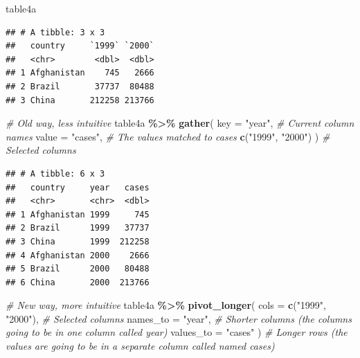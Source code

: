 \documentclass[
]{book}
\newenvironment{Shaded}{\begin{snugshade}}{\end{snugshade}}
\newcommand{\AttributeTok}[1]{\textcolor[rgb]{0.13,0.29,0.53}{#1}}
\newcommand{\CommentTok}[1]{\textcolor[rgb]{0.56,0.35,0.01}{\textit{#1}}}
\newcommand{\FunctionTok}[1]{\textcolor[rgb]{0.13,0.29,0.53}{\textbf{#1}}}
\newcommand{\NormalTok}[1]{#1}
\newcommand{\SpecialCharTok}[1]{\textcolor[rgb]{0.81,0.36,0.00}{\textbf{#1}}}
\newcommand{\StringTok}[1]{\textcolor[rgb]{0.31,0.60,0.02}{#1}}
\begin{document}
\begin{Shaded}
\begin{Highlighting}[]
\NormalTok{table4a}
\end{Highlighting}
\end{Shaded}

\begin{verbatim}
## # A tibble: 3 x 3
##   country     `1999` `2000`
##   <chr>        <dbl>  <dbl>
## 1 Afghanistan    745   2666
## 2 Brazil       37737  80488
## 3 China       212258 213766
\end{verbatim}

\begin{Shaded}
\begin{Highlighting}[]
\CommentTok{\# Old way, less intuitive}
\NormalTok{table4a }\SpecialCharTok{\%\textgreater{}\%}
  \FunctionTok{gather}\NormalTok{(}
    \AttributeTok{key =} \StringTok{"year"}\NormalTok{, }\CommentTok{\# Current column names}
    \AttributeTok{value =} \StringTok{"cases"}\NormalTok{, }\CommentTok{\# The values matched to cases}
    \FunctionTok{c}\NormalTok{(}\StringTok{"1999"}\NormalTok{, }\StringTok{"2000"}\NormalTok{)}
\NormalTok{  ) }\CommentTok{\# Selected columns}
\end{Highlighting}
\end{Shaded}

\begin{verbatim}
## # A tibble: 6 x 3
##   country     year   cases
##   <chr>       <chr>  <dbl>
## 1 Afghanistan 1999     745
## 2 Brazil      1999   37737
## 3 China       1999  212258
## 4 Afghanistan 2000    2666
## 5 Brazil      2000   80488
## 6 China       2000  213766
\end{verbatim}

\begin{Shaded}
\begin{Highlighting}[]
\CommentTok{\# New way, more intuitive}
\NormalTok{table4a }\SpecialCharTok{\%\textgreater{}\%}
  \FunctionTok{pivot\_longer}\NormalTok{(}
    \AttributeTok{cols =} \FunctionTok{c}\NormalTok{(}\StringTok{"1999"}\NormalTok{, }\StringTok{"2000"}\NormalTok{), }\CommentTok{\# Selected columns}
    \AttributeTok{names\_to =} \StringTok{"year"}\NormalTok{, }\CommentTok{\# Shorter columns (the columns going to be in one column called year)}
    \AttributeTok{values\_to =} \StringTok{"cases"}
\NormalTok{  ) }\CommentTok{\# Longer rows (the values are going to be in a separate column called named cases)}
\end{Highlighting}
\end{Shaded}
\end{document}
